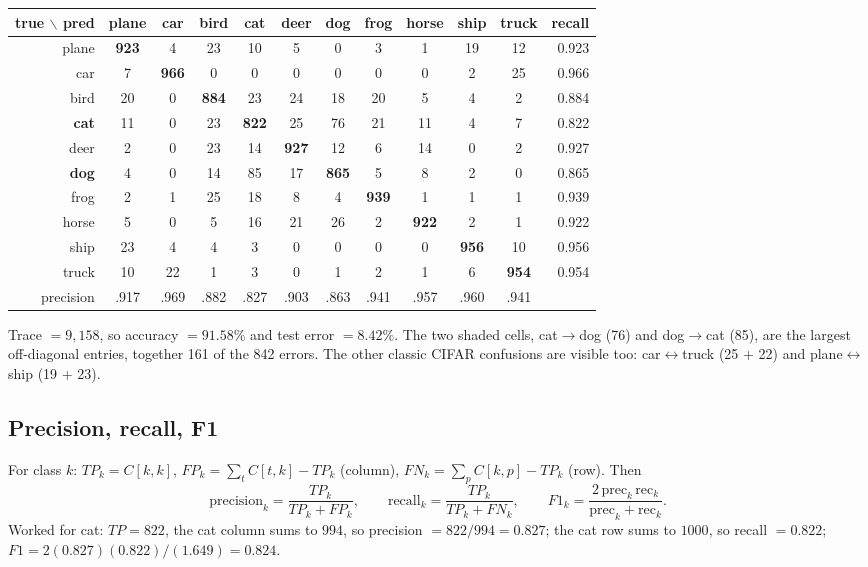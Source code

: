 \begin{repo}
\begin{center}
\scriptsize
\setlength{\tabcolsep}{4.5pt}
\begin{tabular}{@{}r|cccccccccc|r@{}}
true $\backslash$ pred & plane & car & bird & \textbf{cat} & deer & \textbf{dog} & frog & horse & ship & truck & recall\\
\midrule
plane & \textbf{923} & 4 & 23 & 10 & 5 & 0 & 3 & 1 & 19 & 12 & 0.923\\
car & 7 & \textbf{966} & 0 & 0 & 0 & 0 & 0 & 0 & 2 & 25 & 0.966\\
bird & 20 & 0 & \textbf{884} & 23 & 24 & 18 & 20 & 5 & 4 & 2 & 0.884\\
\textbf{cat} & 11 & 0 & 23 & \textbf{822} & 25 & \cellcolor{warn!25}76 & 21 & 11 & 4 & 7 & 0.822\\
deer & 2 & 0 & 23 & 14 & \textbf{927} & 12 & 6 & 14 & 0 & 2 & 0.927\\
\textbf{dog} & 4 & 0 & 14 & \cellcolor{warn!25}85 & 17 & \textbf{865} & 5 & 8 & 2 & 0 & 0.865\\
frog & 2 & 1 & 25 & 18 & 8 & 4 & \textbf{939} & 1 & 1 & 1 & 0.939\\
horse & 5 & 0 & 5 & 16 & 21 & 26 & 2 & \textbf{922} & 2 & 1 & 0.922\\
ship & 23 & 4 & 4 & 3 & 0 & 0 & 0 & 0 & \textbf{956} & 10 & 0.956\\
truck & 10 & 22 & 1 & 3 & 0 & 1 & 2 & 1 & 6 & \textbf{954} & 0.954\\
\midrule
precision & .917 & .969 & .882 & .827 & .903 & .863 & .941 & .957 & .960 & .941 & \\
\end{tabular}
\end{center}
Trace $=9{,}158$, so accuracy $=91.58\%$ and test error $=\mathbf{8.42\%}$. The two shaded cells, cat$\to$dog (76) and dog$\to$cat (85), are the largest off-diagonal entries, together 161 of the 842 errors. The other classic CIFAR confusions are visible too: car$\leftrightarrow$truck (25 + 22) and plane$\leftrightarrow$ship (19 + 23).
\end{repo}

\subsection{Precision, recall, F1}

\begin{idea}
For class $k$: $TP_k=C[k,k]$, $FP_k=\sum_tC[t,k]-TP_k$ (column), $FN_k=\sum_pC[k,p]-TP_k$ (row). Then
\[
  \text{precision}_k=\frac{TP_k}{TP_k+FP_k},\qquad \text{recall}_k=\frac{TP_k}{TP_k+FN_k},\qquad F1_k=\frac{2\,\text{prec}_k\,\text{rec}_k}{\text{prec}_k+\text{rec}_k}.
\]
Worked for cat: $TP=822$, the cat column sums to $994$, so precision $=822/994=0.827$; the cat row sums to $1000$, so recall $=0.822$; $F1=2(0.827)(0.822)/(1.649)=0.824$.
\end{idea}

